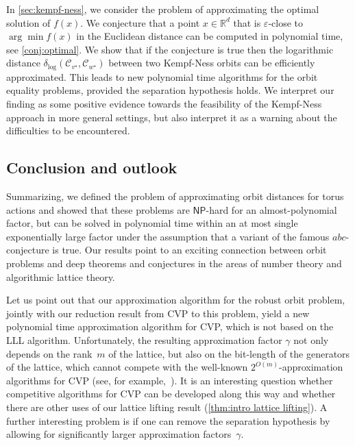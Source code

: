 \documentclass[a4paper,USenglish,cleveref,numberwithinsect]{lipics-v2021}
\DeclareMathOperator{\poly}{poly}
\newcommand{\distLD}{\delta_{\log}}
\newcommand{\RR}{\mathbb{R}}
\newcommand{\KK}{\ensuremath{\mathcal{C}}}
\newcommand{\NP}{\ensuremath{\mathsf{NP}}\xspace}
\newcommand{\abc}{\texorpdfstring{$abc$}{abc}}
\numberwithin{equation}{section}
\begin{document}
In \cref{sec:kempf-ness}, we consider the problem of approximating the optimal solution of $f(x)$. We conjecture that a point $x\in\RR^d$ that is $\varepsilon$-close to $\arg\min f(x)$ in the Euclidean distance can be computed in polynomial time, see \cref{conj:optimal}. We show that if the conjecture is true then the logarithmic distance $\distLD(\KK_{v^\star},\KK_{w^\star})$ between two Kempf-Ness orbits can be efficiently approximated.
This leads to new polynomial time algorithms for the orbit equality problems,
provided the separation hypothesis holds.
We interpret our finding as some positive evidence towards the feasibility
of the Kempf-Ness approach in more general settings, but also interpret it
as a warning about the difficulties to be encountered.


\subsection{Conclusion and outlook}\label{subsec:intro conclusion and outlook}
Summarizing, we defined the problem of approximating orbit distances for torus actions and
showed that these problems are \NP-hard for an almost-polynomial factor,
but can be solved in polynomial time within an at most single exponentially large factor
under the assumption that a variant of the famous \abc-conjecture is true.
Our results point to an exciting connection between orbit problems and deep theorems
and conjectures in the areas of number theory and algorithmic lattice theory.

Let us point out that
our approximation algorithm %
for the robust orbit problem,
jointly with our reduction result from CVP to this problem,
yield a new polynomial time approximation algorithm for CVP,
which is not based on the LLL algorithm. %
Unfortunately,
the resulting approximation factor $\gamma$ %
not only depends on the rank~$m$ of the lattice,
but also on the bit-length of the generators of the lattice,
which cannot compete with the well-known $2^{O(m)}$-approximation algorithms for CVP
(see, for example,~\cite[Lemma~2.12]{micciancio}).
It is an interesting question whether competitive algorithms for CVP can be developed along this way and whether there are other uses of our lattice lifting result
(\cref{thm:intro lattice lifting}).
A further interesting problem is %
if one can remove the separation hypothesis
by allowing for significantly larger approximation factors~$\gamma$.
\end{document}
